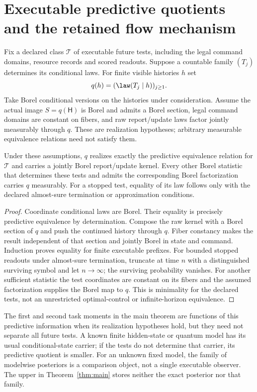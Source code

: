 \section{Executable predictive quotients and the retained flow mechanism}
\label{sec:quotient}
Fix a declared class $\mathcal T$ of executable future tests, including the legal command domains, resource records and scored readouts. Suppose a countable family $(T_j)$ determines its conditional laws. For finite visible histories $h$ set
\[
 q(h)=(\law(T_j\mid h))_{j\ge1}.
\]
Take Borel conditional versions on the histories under consideration. Assume the actual image $S=q(\mathsf H)$ is Borel and admits a Borel section, legal command domains are constant on fibers, and raw report/update laws factor jointly measurably through $q$. These are realization hypotheses; arbitrary measurable equivalence relations need not satisfy them.

\begin{proposition}\label{prop:quotient}
Under these assumptions, $q$ realizes exactly the predictive equivalence relation for $\mathcal T$ and carries a jointly Borel report/update kernel. Every other Borel statistic that determines these tests and admits the corresponding Borel factorization carries $q$ measurably. For a stopped test, equality of its law follows only with the declared almost-sure termination or approximation conditions.
\end{proposition}
\begin{proof}
Coordinate conditional laws are Borel. Their equality is precisely predictive equivalence by determination. Compose the raw kernel with a Borel section of $q$ and push the continued history through $q$. Fiber constancy makes the result independent of that section and jointly Borel in state and command. Induction proves equality for finite executable prefixes. For bounded stopped readouts under almost-sure termination, truncate at time $n$ with a distinguished surviving symbol and let $n\to\infty$; the surviving probability vanishes. For another sufficient statistic the test coordinates are constant on its fibers and the assumed factorization supplies the Borel map to $q$. This is minimality for the declared tests, not an unrestricted optimal-control or infinite-horizon equivalence.
\end{proof}

The first and second task moments in the main theorem are functions of this predictive information when its realization hypotheses hold, but they need not separate all future tests. A known finite hidden-state or quantum model has its usual conditional-state carrier; if the tests do not determine that carrier, its predictive quotient is smaller. For an unknown fixed model, the family of modelwise posteriors is a comparison object, not a single executable observer. The upper in Theorem~\ref{thm:main} stores neither the exact posterior nor that family.

